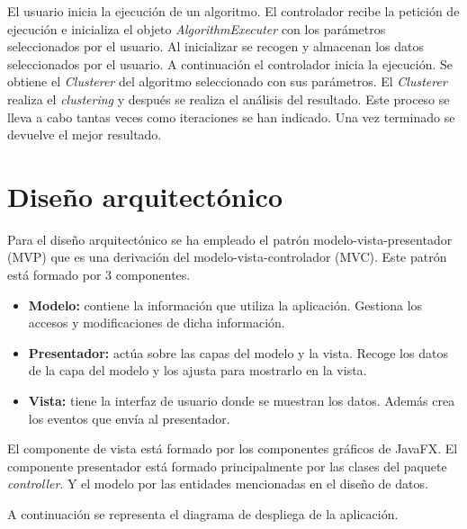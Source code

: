 
El usuario inicia la ejecución de un algoritmo. El controlador recibe la petición de ejecución e inicializa el objeto \emph{AlgorithmExecuter} con los parámetros seleccionados por el usuario. Al inicializar se recogen y almacenan los datos seleccionados por el usuario. A continuación el controlador inicia la ejecución. Se obtiene el \emph{Clusterer} del algoritmo seleccionado con sus parámetros. El \emph{Clusterer} realiza el \emph{clustering} y después se realiza el análisis del resultado. Este proceso se lleva a cabo tantas veces como iteraciones se han indicado. Una vez terminado se devuelve el mejor resultado.

\section{Diseño arquitectónico}
Para el diseño arquitectónico se ha empleado el patrón modelo-vista-presentador (MVP) que es una derivación del modelo-vista-controlador (MVC). Este patrón está formado por 3 componentes.
\begin{itemize}
	\item \textbf{Modelo:} contiene la información que utiliza la aplicación. Gestiona los accesos y modificaciones de dicha información.
	\item \textbf{Presentador:} actúa sobre las capas del modelo y la vista. Recoge los datos de la capa del modelo y los ajusta para mostrarlo en la vista.
	\item \textbf{Vista:} tiene la interfaz de usuario donde se muestran los datos. Además crea los eventos que envía al presentador.
\end{itemize}


El componente de vista está formado por los componentes gráficos de JavaFX. El componente presentador está formado principalmente por las clases del paquete \emph{controller}. Y el modelo por las entidades mencionadas en el diseño de datos.

A continuación se representa el diagrama de despliega de la aplicación.
